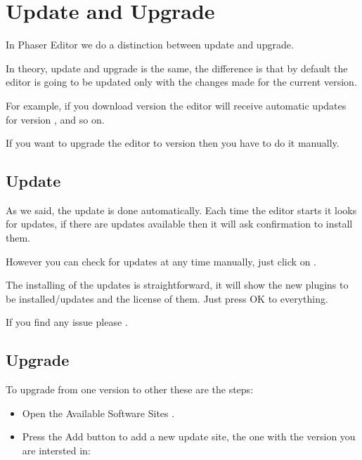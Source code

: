 \documentclass[letterpaper,10pt,english]{sphinxmanual}
\begin{document}
\chapter{Update and Upgrade}
\label{\detokenize{update::doc}}\label{\detokenize{update:update-and-upgrade}}
In Phaser Editor we do a distinction between update and upgrade.

In theory, update and upgrade is the same, the difference is that by default the editor is going to be updated only with the changes made for the current version.

For example, if you download version  the editor will receive automatic updates for version ,  and so on.

If you want to upgrade the editor to version  then you have to do it manually.


\section{Update}
\label{\detokenize{update:update}}
As we said, the update is done automatically. Each time the editor starts it looks for updates, if there are updates available then it will ask confirmation to install them.

However you can check for updates at any time manually, just click on .

The installing of the updates is straightforward, it will show the new plugins to be installed/updates and the license of them. Just press OK to everything.

If you find any issue please  .


\section{Upgrade}
\label{\detokenize{update:upgrade}}
To upgrade from one version to other these are the steps:
\begin{itemize}
\item {} 
Open the Available Software Sites .

\item {} 
Press the Add button to add a new update site, the one with the version you are intersted in:

\end{itemize}
\end{document}
